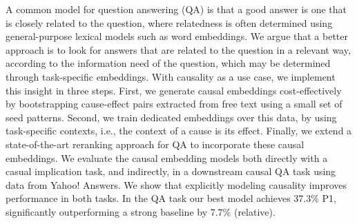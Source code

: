 A common model for question answering (QA) is that a good answer is one that is closely related to the question, where relatedness is often determined using general-purpose lexical models such as word embeddings. We argue that a better approach is to look for answers that are related to the question in a relevant way, according to the information need of the question, which may be determined through task-specific embeddings. With causality as a use case, we implement this insight in three steps. First, we generate causal embeddings cost-effectively by bootstrapping cause-effect pairs extracted from free text using a small set of seed patterns. Second, we train dedicated embeddings over this data, by using task-specific contexts, i.e., the context of a cause is its effect. Finally, we extend a state-of-the-art reranking approach for QA to incorporate these causal embeddings. We evaluate the causal embedding models both directly with a casual implication task, and indirectly, in a downstream causal QA task using data from Yahoo! Answers. We show that explicitly modeling causality improves performance in both tasks. In the QA task our best model achieves 37.3\% P\@1, significantly outperforming a strong baseline by 7.7\% (relative).
